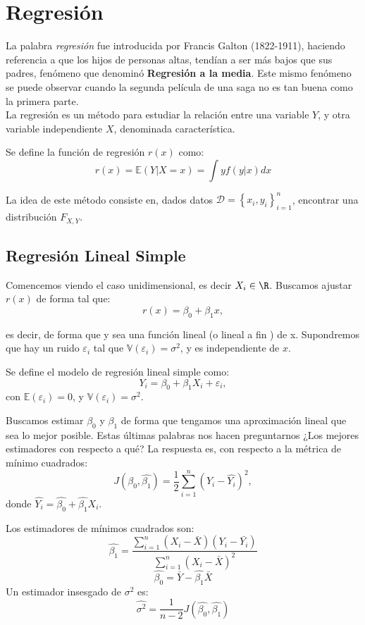 \chapter{Regresión}
La palabra \emph{regresión} fue introducida por Francis Galton (1822-1911), haciendo referencia a que los hijos de personas altas, tendían a ser más bajos que sus padres,  fenómeno que denominó \textbf{Regresión a la media}. Este mismo fenómeno se puede observar cuando la segunda película de una saga no es tan buena como la primera parte. \\
La regresión es un método para estudiar la relación entre una variable $Y$, y otra variable independiente $X$, denominada característica. 
\begin{definition} Se define la función de regresión $r(x)$ como:
$$
r(x)=\mathbb{E}(Y|X=x)=\int yf(y|x)dx
$$

\end{definition}
La idea de este método consiste en, dados datos $\mathcal{D}=\left \{ x_i,y_i \right \}_{i=1}^{n}$, encontrar una distribución $F_{X,Y}$. 
\section{Regresión Lineal Simple}
Comencemos viendo el caso unidimensional, es decir $X_i \in \R$. Buscamos ajustar $r(x)$ de forma tal que: 
$$
r(x)=\beta_0 + \beta_1 x,
$$

 es decir, de forma que y sea una función lineal (o lineal a fin ) de x. 
Supondremos que hay un ruido $\varepsilon_i$ tal que $\mathbb{V}(\varepsilon_i)=\sigma^2$, y es independiente de $x$. \\
\begin{definition}
Se define el modelo de regresión lineal simple como: 
$$
Y_i=\beta_0+\beta_1 X_i+ \varepsilon_i,
$$
con $\mathbb{E}(\varepsilon_i)=0$, y $\mathbb{V}(\varepsilon_i)=\sigma^2$.
\end{definition}
Buscamos estimar $\beta_0$ y $\beta_1$ de forma que tengamos una aproximación lineal que sea lo mejor posible. Estas últimas palabras nos hacen preguntarnos ¿Los mejores estimadores con respecto a qué? La respuesta es, con respecto a la métrica de mínimo cuadrados: 
$$
J(\hat{\beta_0},\hat{\beta_1})=\dfrac{1}{2} \sum_{i=1}^{n}(Y_i-\hat{Y_i})^{2},
$$
donde $\hat{Y_i}=\hat{\beta_0}+\hat{\beta_1}X_i$. 
\begin{theorem}
Los estimadores de mínimos cuadrados son: 
$$
\hat{\beta_1}=\dfrac{\sum_{i=1}^{n}(X_i-\bar{X})(Y_i-\bar{Y_i})}{\sum_{i=1}^{n}(X_i-\bar{X})^{2}}
$$
$$
\hat{\beta_0}=\bar{Y}-\hat{\beta_1}\bar{X}
$$
Un estimador insesgado de $\sigma^2$ es:
$$
\hat{\sigma^2}=\dfrac{1}{n-2} J(\hat{\beta_0},\hat{\beta_1})
$$
\end{theorem}
